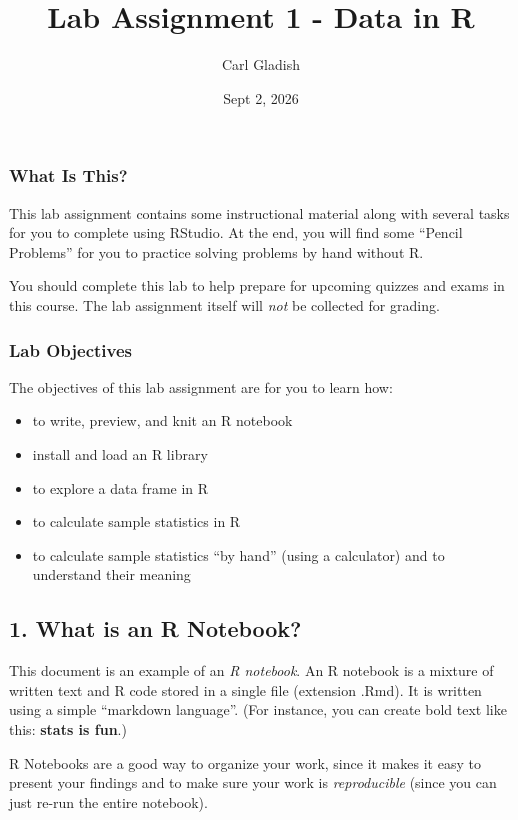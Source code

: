 \documentclass[
]{article}
\title{Lab Assignment 1 - Data in R}
\author{Carl Gladish}
\date{Sept 2, 2026}
\providecommand{\tightlist}{%
  \setlength{\itemsep}{0pt}\setlength{\parskip}{0pt}}
\begin{document}
\maketitle

\subsubsection{What Is This?}\label{what-is-this}

This lab assignment contains some instructional material along with
several tasks for you to complete using RStudio. At the end, you will
find some ``Pencil Problems'' for you to practice solving problems by
hand without R.

You should complete this lab to help prepare for upcoming quizzes and
exams in this course. The lab assignment itself will \emph{not} be
collected for grading.

\subsubsection{Lab Objectives}\label{lab-objectives}

The objectives of this lab assignment are for you to learn how:

\begin{itemize}
\tightlist
\item
  to write, preview, and knit an R notebook
\item
  install and load an R library
\item
  to explore a data frame in R
\item
  to calculate sample statistics in R
\item
  to calculate sample statistics ``by hand'' (using a calculator) and to
  understand their meaning
\end{itemize}

\subsection{1. What is an R Notebook?}\label{what-is-an-r-notebook}

This document is an example of an \emph{R notebook}. An R notebook is a
mixture of written text and R code stored in a single file (extension
.Rmd). It is written using a simple ``markdown language''. (For
instance, you can create bold text like this: \textbf{stats is fun}.)

R Notebooks are a good way to organize your work, since it makes it easy
to present your findings and to make sure your work is
\emph{reproducible} (since you can just re-run the entire notebook).
\end{document}
